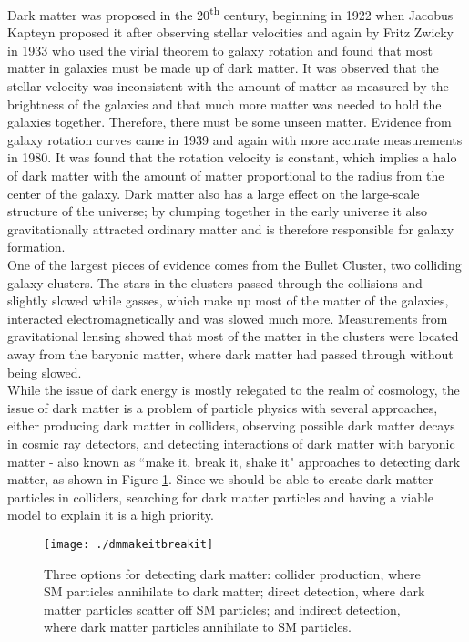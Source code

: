 Dark matter was proposed in the 20\textsuperscript{th} century, beginning in 1922 when Jacobus Kapteyn proposed it after observing stellar velocities\cite{dm1} and again by Fritz Zwicky in 1933 who used the virial theorem to galaxy rotation and found that most matter in galaxies must be made up of dark matter\cite{dm2}.  It was observed that the stellar velocity was inconsistent with the amount of matter as measured by the brightness of the galaxies and that much more matter was needed to hold the galaxies together.  Therefore, there must be some unseen matter.  Evidence from galaxy rotation curves came in 1939\cite{dm3} and again with more accurate measurements in 1980\cite{dm4}.  It was found that the rotation velocity is constant, which implies a halo of dark matter with the amount of matter proportional to the radius from the center of the galaxy.  Dark matter also has a large effect on the large-scale structure of the universe; by clumping together in the early universe it also gravitationally attracted ordinary matter and is therefore responsible for galaxy formation.  \\

One of the largest pieces of evidence comes from the Bullet Cluster, two colliding galaxy clusters.  The stars in the clusters passed through the collisions and slightly slowed while gasses, which make up most of the matter of the galaxies, interacted electromagnetically and was slowed much more.  Measurements from gravitational lensing showed that most of the matter in the clusters were located away from the baryonic matter, where dark matter had passed through without being slowed\cite{bulletcluster}.  \\

While the issue of dark energy is mostly relegated to the realm of cosmology, the issue of dark matter is a problem of particle physics with several approaches, either producing dark matter in colliders, observing possible dark matter decays in cosmic ray detectors, and detecting interactions of dark matter with baryonic matter - also known as ``make it, break it, shake it" approaches to detecting dark matter, as shown in Figure \ref{fig:dmMake}.  Since we should be able to create dark matter particles in colliders, searching for dark matter particles and having a viable model to explain it is a high priority.  \\


\begin{figure}[h!]
  \centering
	\texttt{[image: ./dmmakeitbreakit]}
\caption{\label{fig:dmMake}{ Three options for detecting dark matter: collider production, where SM particles annihilate to dark matter; direct detection, where dark matter particles scatter off SM particles; and indirect detection, where dark matter particles annihilate to SM particles.  }} 
\end{figure}

